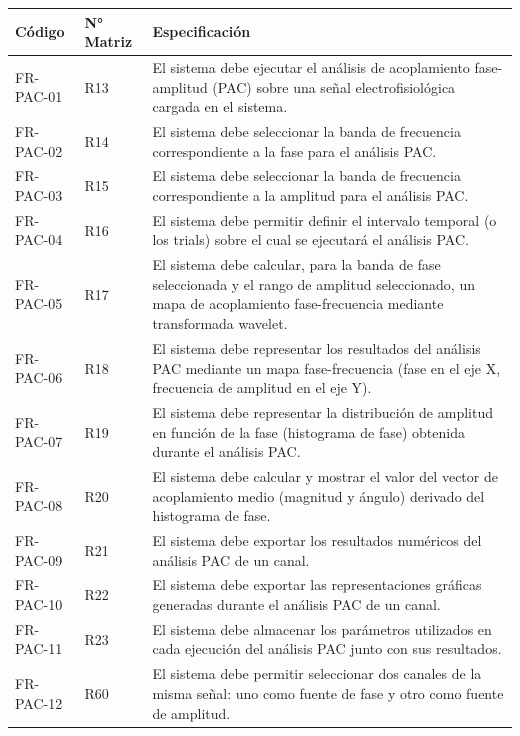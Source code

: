 \documentclass[12pt, letterpaper]{article}
\begin{document}
\begin{longtable}{|p{2.5cm}|p{2.5cm}|p{10.1cm}|}
\hline
\rowcolor{gray!25}
\textbf{Código} & \textbf{N° Matriz} & \textbf{Especificación} \\
\hline
\endhead

\hline
\endlastfoot

FR-PAC-01 & R13 & El sistema debe ejecutar el análisis de acoplamiento fase-amplitud (PAC) sobre una señal electrofisiológica cargada en el sistema. \\
\hline
FR-PAC-02 & R14 & El sistema debe seleccionar la banda de frecuencia correspondiente a la fase para el análisis PAC. \\
\hline
FR-PAC-03 & R15 & El sistema debe seleccionar la banda de frecuencia correspondiente a la amplitud para el análisis PAC. \\
\hline
FR-PAC-04 & R16 & El sistema debe permitir definir el intervalo temporal (o los trials) sobre el cual se ejecutará el análisis PAC. \\
\hline
FR-PAC-05 & R17 & El sistema debe calcular, para la banda de fase seleccionada y el rango de amplitud seleccionado, un mapa de acoplamiento fase-frecuencia mediante transformada wavelet. \\
\hline
FR-PAC-06 & R18 & El sistema debe representar los resultados del análisis PAC mediante un mapa fase-frecuencia (fase en el eje X, frecuencia de amplitud en el eje Y). \\
\hline
FR-PAC-07 & R19 & El sistema debe representar la distribución de amplitud en función de la fase (histograma de fase) obtenida durante el análisis PAC. \\
\hline
FR-PAC-08 & R20 & El sistema debe calcular y mostrar el valor del vector de acoplamiento medio (magnitud y ángulo) derivado del histograma de fase. \\
\hline
FR-PAC-09 & R21 & El sistema debe exportar los resultados numéricos del análisis PAC de un canal. \\
\hline
FR-PAC-10 & R22 & El sistema debe exportar las representaciones gráficas generadas durante el análisis PAC de un canal. \\
\hline
FR-PAC-11 & R23 & El sistema debe almacenar los parámetros utilizados en cada ejecución del análisis PAC junto con sus resultados. \\
\hline
FR-PAC-12 & R60 & El sistema debe permitir seleccionar dos canales de la misma señal: uno como fuente de fase y otro como fuente de amplitud. \\
\hline

\end{longtable}
\end{document}
